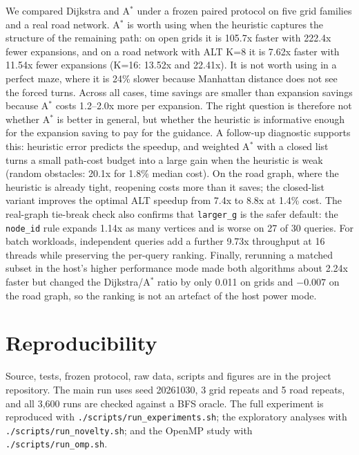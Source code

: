 \documentclass[conference,10pt]{IEEEtran}
\newcommand{\Astar}{A$^\ast$}
\newcommand{\code}[1]{\texttt{#1}}
\begin{document}
We compared Dijkstra and \Astar{} under a frozen paired protocol on five grid
families and a real road network.  \Astar{} is worth using when the heuristic
captures the structure of the remaining path: on open grids it is 105.7x faster
with 222.4x fewer expansions, and on a road network with ALT K=8 it is 7.62x
faster with 11.54x fewer expansions (K=16: 13.52x and 22.41x).  It is not worth
using in a perfect maze, where it is 24\% slower because Manhattan distance does
not see the forced turns.  Across all cases, time savings are smaller than
expansion savings because \Astar{} costs 1.2--2.0x more per expansion.  The right question is therefore not whether \Astar{} is better in general, but
whether the heuristic is informative enough for the expansion saving to pay for
the guidance.  A follow-up diagnostic supports this: heuristic error predicts
the speedup, and weighted \Astar{} with a closed list turns a small path-cost
budget into a large gain when the heuristic is weak (random obstacles: 20.1x for
1.8\% median cost).  On the road graph, where the heuristic is already tight,
reopening costs more than it saves; the closed-list variant improves the
optimal ALT speedup from 7.4x to 8.8x at 1.4\% cost.  The real-graph tie-break
check also confirms that \code{larger\_g} is the safer default: the
\code{node\_id} rule expands 1.14x as many vertices and is worse on 27 of 30
queries.
For batch workloads, independent queries add a further 9.73x throughput at 16
threads while preserving the per-query ranking.  Finally, rerunning a matched
subset in the host's higher performance mode made both algorithms about 2.24x
faster but changed the Dijkstra/\Astar{} ratio by only 0.011 on grids and
$-0.007$ on the road graph, so the ranking is not an artefact of the host power
mode.

\section*{Reproducibility}
Source, tests, frozen protocol, raw data, scripts and figures are in the
project repository.  The main run uses seed 20261030, 3 grid repeats and 5 road
repeats, and all 3,600 runs are checked against a BFS oracle.  The full
experiment is reproduced with
\code{./scripts/run\_experiments.sh}; the exploratory analyses with
\code{./scripts/run\_novelty.sh}; and the OpenMP study with
\code{./scripts/run\_omp.sh}.


\end{document}
